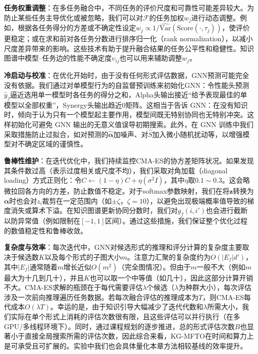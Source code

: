 \documentclass[../main.tex]{subfiles}
\begin{document}
\textbf{任务权重调整}：在多任务融合中，不同任务的评价尺度和可靠性可能差异较大。为防止某些任务主导优化或被忽略，我们可以对$\mathcal{F}$的任务加权$w_j$进行动态调整。例如，根据各任务得分的方差或不确定性设定$w_j \propto 1/\widehat{\mathrm{Var}}(\text{Score}(\cdot,\tau_j))$，使评价更稳定；或在求和前对各任务分数进行排序归一化（rank normalization），以减小尺度差异带来的影响。这些技术有助于提升融合结果的任务公平性和稳健性。知识图谱中模型--任务边的性能不确定度$\upsilon_{ij}$也可以用来辅助调整$w_j$。

\textbf{冷启动与校准}：在优化开始时，由于没有任何形式评估数据，GNN预测可能完全没有依据。我们通过对单模型行为的自监督预训练来初始化GNN：令性能头预测$\hat{y}_f$逼近选用单一模型时各任务的得分之和，Alpha头输出接近“给予表现最佳的单模型以全部权重”，Synergy头输出趋近0矩阵。这相当于告诉 GNN：在没有知识时，倾向于认为只有一个模型起主要作用，模型间既无特别协同也无特别冲突。这样初始化可避免 GNN 输出的无意义值误导初期搜索。此外，在 GNN 训练中我们采取措施防止过拟合，如对预测的$\hat{\boldsymbol{\alpha}}$加噪声、对$\hat{S}$加入微小随机扰动等，以增强模型对不确定区域的谨慎性。

\textbf{鲁棒性维护}：在迭代优化中，我们持续监控CMA-ES的协方差矩阵状况。如果发现其条件数过高（表示过度相关或尺度不均），我们采取对角加载（diagonal loading）方式正则化：令$C \leftarrow (1-\eta)C + \eta(\sigma^2 I)$，其中$\eta$取$0.1\sim0.3$。这会略微拉回各方向的方差，防止数值不稳定。对于softmax参数映射，我们在将$\mathbf{z}$转换为$\boldsymbol{\alpha}$时也会对$z_i$裁剪在一定范围内（如$\pm \zeta$，$\zeta=10$），以避免出现极端概率值导致的梯度消失或算术下溢。在知识图谱更新协同分数时，我们对$g_f(i,i')$也会进行截断以防异常值（例如限制在$[-1,1]$区间）。通过这些措施，我们保证整个优化过程的数值稳定性和鲁棒收敛。

\textbf{复杂度与效率}：每次迭代中，GNN对候选形式的推理和评分计算的复杂度主要取决于候选数$K$以及每个形式的子图大小$m$。注意力汇聚的复杂度约为$O(|E_f|d')$，其中$|E_f|$通常随着$m$增长近似$O(m^2)$（完全图情况）。但由于$m$一般不大（例如$m$最大为十几到几十），并且$K$也可以取一个中等值（如几十），因此这部分计算开销不大。CMA-ES求解的瓶颈在于每代需要评估$\lambda$个候选（$\lambda$为种群大小），每次评估涉及一次前向推理遍历任务数据。若每次融合评估的推理成本为$T$，则CMA-ES每代成本$O(\lambda T)$。幸运的是，由于知识引导大幅减少了迭代代数和$\lambda$所需大小，我们实际在单个形式上消耗的评估次数很有限，且这些评估可以并行执行（在多GPU/多线程环境下）。同时，通过课程规划的逐步推进，总的形式评估次数$B$也显著小于直接全局搜索所需的评估次数，因此综合来看，KG-MFTO在时间和算力上是可承受且可扩展的。实验中我们也会具体量化本章方法相较基线的效率提升。
\end{document}
